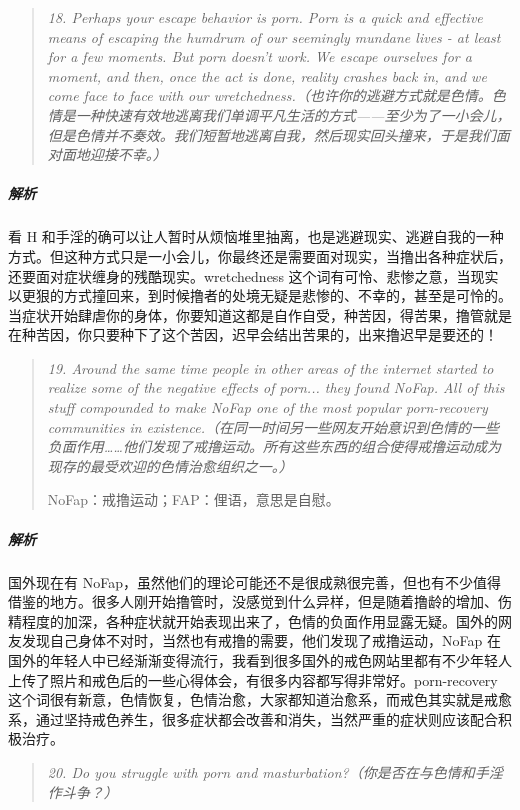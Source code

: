 \begin{quote}\it
    18. Perhaps your escape behavior is porn. Porn is a quick and effective means of escaping the humdrum of our seemingly mundane lives - at least for a few moments. But porn doesn't work. We escape ourselves for a moment, and then, once the act is done, reality crashes back in, and we come face to face with our wretchedness.（也许你的逃避方式就是色情。色情是一种快速有效地逃离我们单调平凡生活的方式——至少为了一小会儿，但是色情并不奏效。我们短暂地逃离自我，然后现实回头撞来，于是我们面对面地迎接不幸。）
\end{quote}

\subparagraph{解析} 看 H 和手淫的确可以让人暂时从烦恼堆里抽离，也是逃避现实、逃避自我的一种方式。但这种方式只是一小会儿，你最终还是需要面对现实，当撸出各种症状后，还要面对症状缠身的残酷现实。wretchedness 这个词有可怜、悲惨之意，当现实以更狠的方式撞回来，到时候撸者的处境无疑是悲惨的、不幸的，甚至是可怜的。当症状开始肆虐你的身体，你要知道这都是自作自受，种苦因，得苦果，撸管就是在种苦因，你只要种下了这个苦因，迟早会结出苦果的，出来撸迟早是要还的！

\begin{quote}\it
    19. Around the same time people in other areas of the internet started to realize some of the negative effects of porn... they found NoFap. All of this stuff compounded to make NoFap one of the most popular porn-recovery communities in existence.（在同一时间另一些网友开始意识到色情的一些负面作用……他们发现了戒撸运动。所有这些东西的组合使得戒撸运动成为现存的最受欢迎的色情治愈组织之一。）

    NoFap：戒撸运动；FAP：俚语，意思是自慰。
\end{quote}

\subparagraph{解析} 国外现在有 NoFap，虽然他们的理论可能还不是很成熟很完善，但也有不少值得借鉴的地方。很多人刚开始撸管时，没感觉到什么异样，但是随着撸龄的增加、伤精程度的加深，各种症状就开始表现出来了，色情的负面作用显露无疑。国外的网友发现自己身体不对时，当然也有戒撸的需要，他们发现了戒撸运动，NoFap 在国外的年轻人中已经渐渐变得流行，我看到很多国外的戒色网站里都有不少年轻人上传了照片和戒色后的一些心得体会，有很多内容都写得非常好。porn-recovery 这个词很有新意，色情恢复，色情治愈，大家都知道治愈系，而戒色其实就是戒愈系，通过坚持戒色养生，很多症状都会改善和消失，当然严重的症状则应该配合积极治疗。

\begin{quote}\it
    20. Do you struggle with porn and masturbation?（你是否在与色情和手淫作斗争？）
\end{quote}

